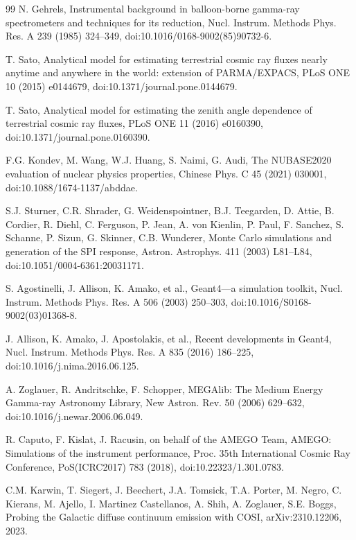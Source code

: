 \documentclass[preprint,12pt]{elsarticle}
\begin{document}
\begin{thebibliography}{99}
N. Gehrels, Instrumental background in balloon-borne gamma-ray spectrometers and techniques for its reduction, Nucl. Instrum. Methods Phys. Res. A 239 (1985) 324--349, doi:10.1016/0168-9002(85)90732-6.

T. Sato, Analytical model for estimating terrestrial cosmic ray fluxes nearly anytime and anywhere in the world: extension of PARMA/EXPACS, PLoS ONE 10 (2015) e0144679, doi:10.1371/journal.pone.0144679.

T. Sato, Analytical model for estimating the zenith angle dependence of terrestrial cosmic ray fluxes, PLoS ONE 11 (2016) e0160390, doi:10.1371/journal.pone.0160390.

F.G. Kondev, M. Wang, W.J. Huang, S. Naimi, G. Audi, The NUBASE2020 evaluation of nuclear physics properties, Chinese Phys. C 45 (2021) 030001, doi:10.1088/1674-1137/abddae.

S.J. Sturner, C.R. Shrader, G. Weidenspointner, B.J. Teegarden, D. Attie, B. Cordier, R. Diehl, C. Ferguson, P. Jean, A. von Kienlin, P. Paul, F. Sanchez, S. Schanne, P. Sizun, G. Skinner, C.B. Wunderer, Monte Carlo simulations and generation of the SPI response, Astron. Astrophys. 411 (2003) L81--L84, doi:10.1051/0004-6361:20031171.

S. Agostinelli, J. Allison, K. Amako, et al., Geant4---a simulation toolkit, Nucl. Instrum. Methods Phys. Res. A 506 (2003) 250--303, doi:10.1016/S0168-9002(03)01368-8.

J. Allison, K. Amako, J. Apostolakis, et al., Recent developments in Geant4, Nucl. Instrum. Methods Phys. Res. A 835 (2016) 186--225, doi:10.1016/j.nima.2016.06.125.

A. Zoglauer, R. Andritschke, F. Schopper, MEGAlib: The Medium Energy Gamma-ray Astronomy Library, New Astron. Rev. 50 (2006) 629--632, doi:10.1016/j.newar.2006.06.049.

R. Caputo, F. Kislat, J. Racusin, on behalf of the AMEGO Team, AMEGO: Simulations of the instrument performance, Proc. 35th International Cosmic Ray Conference, PoS(ICRC2017) 783 (2018), doi:10.22323/1.301.0783.

C.M. Karwin, T. Siegert, J. Beechert, J.A. Tomsick, T.A. Porter, M. Negro, C. Kierans, M. Ajello, I. Martinez Castellanos, A. Shih, A. Zoglauer, S.E. Boggs, Probing the Galactic diffuse continuum emission with COSI, arXiv:2310.12206, 2023.


\end{thebibliography}
\end{document}
